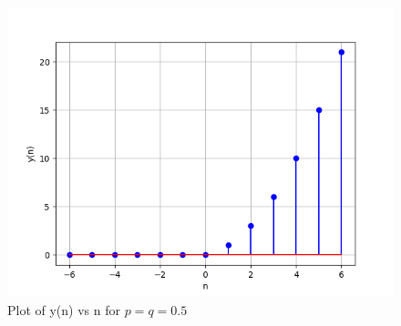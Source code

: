 \documentclass[journal,12pt,twocolumn]{IEEEtran}
\theoremstyle{remark}
\begin{document}
\begin{figure}[!h]
    \centering
    \includegraphics[width = \columnwidth]{ncert-maths/11/9/2/8/figs/y_plot.png}
    \caption{Plot of y(n) vs n for $p=q=0.5$}
    \label{fig:2}
\end{figure}
\end{document}
